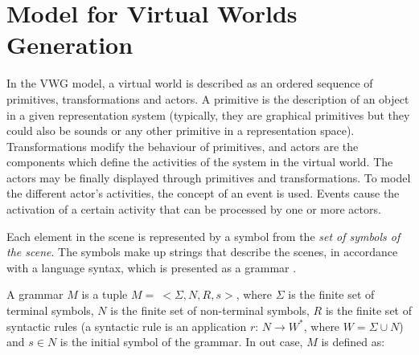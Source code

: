 \documentclass{svmult}
\begin{document}


\section{Model for Virtual Worlds Generation
\label{sec:model}}

In the VWG model, a virtual world is described as an ordered sequence of primitives, transformations and actors.
A primitive is the description of an object in a given representation system (typically, they are graphical primitives but they could also be sounds or any other primitive in a representation space).
Transformations modify the behaviour of primitives, and actors are the components which define the
activities of the system in the virtual world. The actors may be finally displayed through primitives and transformations. To model the different actor's activities, the concept of an event is used. Events cause the activation of a certain activity that can be processed by one or more actors.

Each element in the scene is represented by a symbol from the \textit{set of symbols of
the scene}. The symbols make up strings that describe the scenes, in accordance with a 
language syntax, which is presented as a grammar \cite{Davis1994}. 


A grammar $M$ is a tuple $M= \ <\Sigma, N, R, s>$, where $\Sigma$ is the finite set of
terminal symbols, $N$ is the finite set of non-terminal symbols, $R$ is the finite set of syntactic rules (a syntactic rule is an application $r$: $N \rightarrow W^*$, where $W = \Sigma \cup N$)
and $s \in N$ is the initial symbol of the grammar. In out case, $M$ is defined as:
\end{document}
